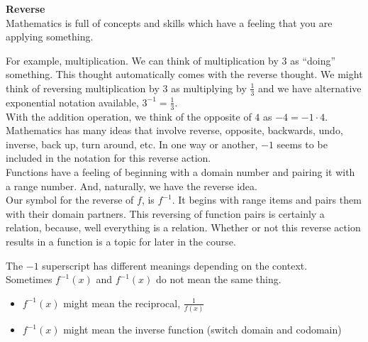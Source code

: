 \documentclass{ximera}
\begin{document}
\begin{notation} \textbf{\textcolor{purple!85!blue}{Reverse}}  \\

Mathematics is full of concepts and skills which have a feeling that you are applying something.

For example, multiplication.  We can think of multiplication by $3$ as ``doing'' something.  This thought automatically comes with the reverse thought.  We might think of reversing multiplication by $3$ as multiplying by $\frac{1}{3}$ and we have alternative exponential notation available, $3^{-1} = \frac{1}{3}$. \\


With the addition operation, we think of the opposite of $4$ as $-4 = -1 \cdot 4$. \\


Mathematics has many ideas that involve reverse, opposite, backwards, undo, inverse, back up, turn around, etc. In one way or another, $-1$ seems to be included in the notation for this reverse action.  \\


Functions have a feeling of beginning with a domain number and pairing it with a range number.  And, naturally, we have the reverse idea. \\

Our symbol for the reverse of $f$, is $f^{-1}$.  It begins with range items and pairs them with their domain partners.  This reversing of function pairs is certainly a relation, because, well everything is a relation.  Whether or not this reverse action results in a function is a topic for later in the course.



\end{notation}



\begin{warning}


The $-1$ superscript has different meanings depending on the context. \\


Sometimes $f^{-1}(x)$ and $f^{-1}(x)$ do not mean the same thing.\\


\begin{itemize}
\item $f^{-1}(x)$ might mean the reciprocal, $\frac{1}{f(x)}$
\item $f^{-1}(x)$ might mean the inverse function (switch domain and codomain)
\end{itemize}



\end{warning}
\end{document}
